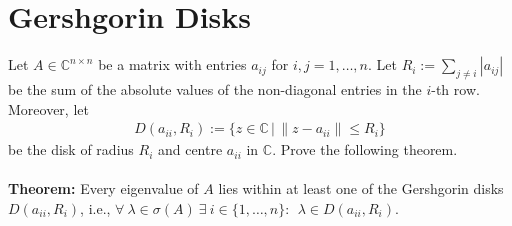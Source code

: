 \section{Gershgorin Disks}
Let $A \in \mathbb{C} ^{n \times n }$ be a matrix with entries $a_{ij}$ for $i,j = 1,\dots,n$. Let
$	R_i := \sum_{j \neq i} |a_{ij}|$
be the sum of the absolute values of the non-diagonal entries in the $i$-th row. Moreover, let
\begin{align*}
D(a_{ii}, R_i) := \lbrace z \in \mathbb{C}\,|\, \|z - a_{ii}\| \leq R_i \rbrace
\end{align*}
be the disk of radius $R_i$ and centre $a_{ii}$ in $\mathbb{C}$.
Prove the following theorem.
~\\
~\\
\textbf{Theorem:} Every eigenvalue of $A$ lies within at least one of the Gershgorin disks $D(a_{ii}, R_i)$, i.e., $\forall~\lambda\in\sigma(A)~\exists~i\in\{1,\dots,n\}:~~\lambda\in D(a_{ii}, R_i)$.